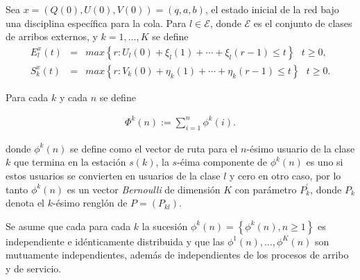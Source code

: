 Sea
$x=\left(Q\left(0\right),U\left(0\right),V\left(0\right)\right)=\left(q,a,b\right)$,
el estado inicial de la red bajo una disciplina espec\'ifica para
la cola. Para $l\in\mathcal{E}$, donde $\mathcal{E}$ es el conjunto de clases de arribos externos, y $k=1,\ldots,K$ se define\\
\begin{eqnarray*}
E_{l}^{x}\left(t\right)&=&max\left\{r:U_{l}\left(0\right)+\xi_{l}\left(1\right)+\cdots+\xi_{l}\left(r-1\right)\leq
t\right\}\textrm{   }t\geq0,\\
S_{k}^{x}\left(t\right)&=&max\left\{r:V_{k}\left(0\right)+\eta_{k}\left(1\right)+\cdots+\eta_{k}\left(r-1\right)\leq
t\right\}\textrm{   }t\geq0.
\end{eqnarray*}

Para cada $k$ y cada $n$ se define

\begin{eqnarray*}\label{Eq.phi}
\Phi^{k}\left(n\right):=\sum_{i=1}^{n}\phi^{k}\left(i\right).
\end{eqnarray*}

donde $\phi^{k}\left(n\right)$ se define como el vector de ruta
para el $n$-\'esimo usuario de la clase $k$ que termina en la
estaci\'on $s\left(k\right)$, la $s$-\'eima componente de
$\phi^{k}\left(n\right)$ es uno si estos usuarios se convierten en
usuarios de la clase $l$ y cero en otro caso, por lo tanto
$\phi^{k}\left(n\right)$ es un vector {\em Bernoulli} de
dimensi\'on $K$ con par\'ametro $P_{k}^{'}$, donde $P_{k}$ denota
el $k$-\'esimo rengl\'on de $P=\left(P_{kl}\right)$.

Se asume que cada para cada $k$ la sucesi\'on $\phi^{k}\left(n\right)=\left\{\phi^{k}\left(n\right),n\geq1\right\}$
es independiente e id\'enticamente distribuida y que las
$\phi^{1}\left(n\right),\ldots,\phi^{K}\left(n\right)$ son
mutuamente independientes, adem\'as de independientes de los
procesos de arribo y de servicio.\\

